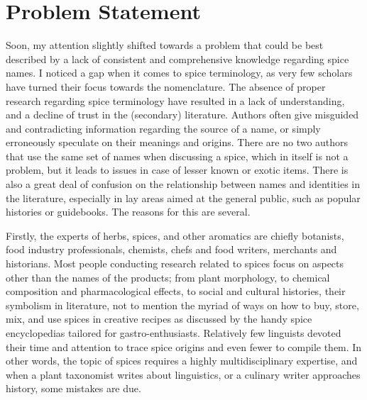 \section{Problem Statement}

Soon, my attention slightly shifted towards a problem that could be best described by a lack of consistent and comprehensive knowledge regarding spice names. I noticed a gap when it comes to spice terminology, as very few scholars have turned their focus towards the nomenclature. The absence of proper research regarding spice terminology have resulted in a lack of understanding, and a decline of trust in the (secondary) literature. Authors often give misguided and contradicting information regarding the source of a name, or simply erroneously speculate on their meanings and origins. There are no two authors that use the same set of names when discussing a spice, which in itself is not a problem, but it leads to issues in case of lesser known or exotic items. There is also a great deal of confusion on the relationship between names and identities in the literature, especially in lay areas aimed at the general public, such as popular histories or guidebooks. The reasons for this are several.

Firstly, the experts of herbs, spices, and other aromatics are chiefly botanists, food industry professionals, chemists, chefs and food writers, merchants and historians. Most people conducting research related to spices focus on aspects other than the names of the products; from plant morphology, to chemical composition and pharmacological effects, to social and cultural histories, their symbolism in literature, not to mention the myriad of ways on how to buy, store, mix, and use spices in creative recipes as discussed by the handy spice encyclopedias tailored for gastro-enthusiasts. Relatively few linguists devoted their time and attention to trace spice origins and even fewer to compile them. In other words, the topic of spices requires a highly multidisciplinary expertise, and when a plant taxonomist writes about linguistics, or a culinary writer approaches history, some mistakes are due.


